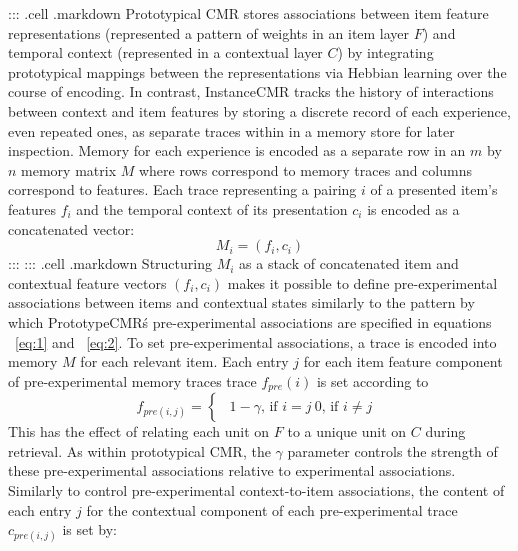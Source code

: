{}::: {.cell .markdown} Prototypical CMR stores associations between item feature representations (represented a pattern of weights in an item layer $F$) and temporal context (represented in a contextual layer $C$) by integrating prototypical mappings between the representations via Hebbian learning over the course of encoding. In contrast, InstanceCMR tracks the history of interactions between context and item features by storing a discrete record of each experience, even repeated ones, as separate traces within in a memory store for later inspection. Memory for each experience is encoded as a separate row in an $m$ by $n$ memory matrix $M$ where rows correspond to memory traces and columns correspond to features. Each trace representing a pairing $i$ of a presented item's features $f_i$ and the temporal context of its presentation $c_i$ is encoded as a concatenated vector:\markdownRendererInterblockSeparator
{}\begin{equation} \label{eq:14}M_i = (f_i, c_i)\end{equation} :::\markdownRendererInterblockSeparator
{}::: {.cell .markdown}\markdownRendererInterblockSeparator
{}\markdownRendererInterblockSeparator
{}Structuring $M_i$ as a stack of concatenated item and contextual feature vectors $(f_i, c_i)$ makes it possible to define pre-experimental associations between items and contextual states similarly to the pattern by which PrototypeCMR\'s pre-experimental associations are specified in equations ~\ref{eq:1} and ~\ref{eq:2}. To set pre-experimental associations, a trace is encoded into memory $M$ for each relevant item. Each entry $j$ for each item feature component of pre-experimental memory traces trace $f_{pre}(i)$ is set according to\markdownRendererInterblockSeparator
{}\begin{equation} \label{eq:14} f_{pre(i, j)} = \begin{cases} \begin{alignedat}{2} 1 - \gamma \text{, if } i=j \ 0 \text{, if } i \neq j \end{alignedat} \end{cases} \end{equation}\markdownRendererInterblockSeparator
{}This has the effect of relating each unit on $F$ to a unique unit on $C$ during retrieval. As within prototypical CMR, the $\gamma$ parameter controls the strength of these pre-experimental associations relative to experimental associations.\markdownRendererInterblockSeparator
{}Similarly to control pre-experimental context-to-item associations, the content of each entry $j$ for the contextual component of each pre-experimental trace $c_{pre(i,j)}$ is set by:\markdownRendererInterblockSeparator
